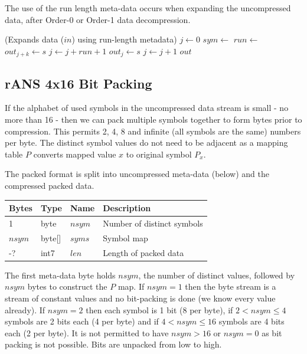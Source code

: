 \documentclass[a4paper]{article}
\begin{document}
The use of the run length meta-data occurs when expanding the
uncompressed data, after Order-0 or Order-1 data decompression.

\begin{algorithmic}[1]
\Statex (Expands data ($in$) using run-length metadata)
  \State $j \gets 0$
    \State $sym \gets$ 
      \State $run \gets$ 
          \State $out_{j+k} \gets s$
      \EndFor
      \State $j \gets j + run + 1$
    \Else
      \State $out_j \gets s$
      \State $j \gets j + 1$
    \EndIf
  \EndFor
  \State \Return $out$
\EndFunction
\end{algorithmic}


\subsection{rANS 4x16 Bit Packing}
\label{sec:ranspack}

If the alphabet of used symbols in the uncompressed data stream is
small - no more than 16 - then we can pack multiple symbols together
to form bytes prior to compression.  This permits 2, 4, 8 and infinite
(all symbols are the same) numbers per byte.  The distinct
symbol values do not need to be adjacent as a mapping table $P$
converts mapped value $x$ to original symbol $P_x$.

The packed format is split into uncompressed meta-data (below) and the compressed packed data.

\begin{table}[h]
\centering
\begin{tabular}{lllp{9cm}}
\textbf{Bytes} & \textbf{Type} & \textbf{Name} & \textbf{Description}\\
\hline
1      & byte   & $nsym$ & Number of distinct symbols\\
$nsym$ & byte[] & $syms$ & Symbol map \\
-?     & int7   & $len$  & Length of packed data
\end{tabular}
\end{table}

The first meta-data byte holds $nsym$, the number of distinct values, followed
by $nsym$ bytes to construct the $P$ map.  If $nsym = 1$ then the byte
stream is a stream of constant values and no bit-packing is done (we
know every value already).  If $nsym = 2$ then each symbol is 1 bit (8
per byte), if $2 < nsym \le 4$ symbols are 2 bits each (4 per byte)
and if $4 < nsym \le 16$ symbols are 4 bits each (2 per byte). It is
not permitted to have $nsym > 16$ or $nsym = 0$ as bit packing is not
possible. Bits are unpacked from low to high.
\end{document}
